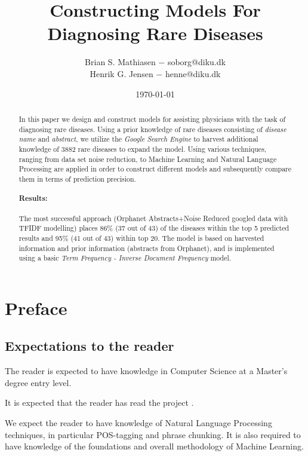 \documentclass[10pt,letterpaper,final]{article}
\title{Constructing Models For Diagnosing Rare Diseases}
\author{Brian S. Mathiasen $-$ soborg@diku.dk \\
        Henrik G. Jensen $-$ henne@diku.dk\\
}
\date{\today} %
\begin{document}
\maketitle


\begin{abstract}
In this paper we design and construct models for assisting physicians
with the task of diagnosing rare diseases. Using a prior knowledge of
rare diseases consisting of \textit{disease name} and \textit{abstract},
we utilize the \textit{Google Search Engine} to harvest additional
knowledge of 3882 rare diseases to expand the model. Using various
techniques, ranging from data set noise reduction, to Machine
Learning and Natural Language Processing are applied in order to
construct different models and subsequently compare them in terms of
prediction precision.

\paragraph{Results: }The most successful approach (Orphanet Abstracts+Noise Reduced googled
data with TFIDF modelling) places 86\% (37 out of 43) of the diseases
within the top 5 predicted results and 95\% (41 out of 43) within top
20. The model is based on harvested information and prior information
(abstracts from Orphanet), and is implemented using a basic \textit{Term
Frequency - Inverse Document Frequency} model.
\end{abstract}

\section{Preface}
\subsection{Expectations to the reader}
The reader is expected to have knowledge in Computer Science at a
Master's degree entry level.

It is expected that the reader has read the project
\cite{jensenandersen}.

We expect the reader to have knowledge of Natural Language Processing
techniques, in particular POS-tagging and phrase chunking. It is also
required to have knowledge of the foundations and overall methodology of
Machine Learning.
\end{document}
